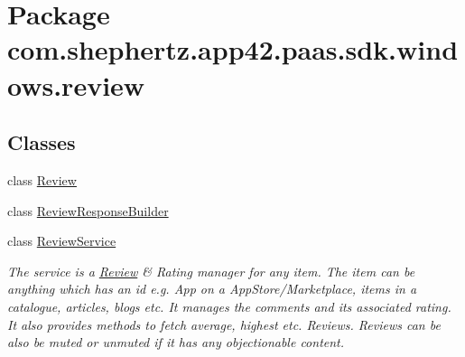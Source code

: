 \hypertarget{namespacecom_1_1shephertz_1_1app42_1_1paas_1_1sdk_1_1windows_1_1review}{\section{Package com.\+shephertz.\+app42.\+paas.\+sdk.\+windows.\+review}
\label{namespacecom_1_1shephertz_1_1app42_1_1paas_1_1sdk_1_1windows_1_1review}
}
\subsection*{Classes}
\begin{DoxyCompactItemize}
\item 
class \hyperlink{classcom_1_1shephertz_1_1app42_1_1paas_1_1sdk_1_1windows_1_1review_1_1_review}{Review}
\item 
class \hyperlink{classcom_1_1shephertz_1_1app42_1_1paas_1_1sdk_1_1windows_1_1review_1_1_review_response_builder}{Review\+Response\+Builder}
\item 
class \hyperlink{classcom_1_1shephertz_1_1app42_1_1paas_1_1sdk_1_1windows_1_1review_1_1_review_service}{Review\+Service}
\begin{DoxyCompactList}\small\item\em The service is a \hyperlink{classcom_1_1shephertz_1_1app42_1_1paas_1_1sdk_1_1windows_1_1review_1_1_review}{Review} \& Rating manager for any item. The item can be anything which has an id e.\+g. App on a App\+Store/\+Marketplace, items in a catalogue, articles, blogs etc. It manages the comments and its associated rating. It also provides methods to fetch average, highest etc. Reviews. Reviews can be also be muted or unmuted if it has any objectionable content. \end{DoxyCompactList}\end{DoxyCompactItemize}
